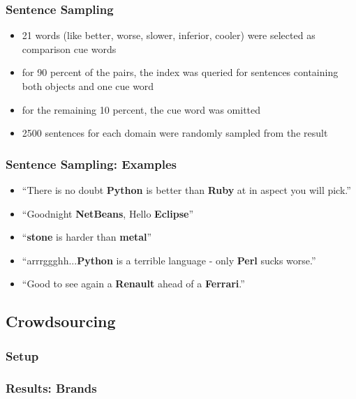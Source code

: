 \documentclass[11pt,aspectratio=169]{beamer}
\begin{document}
    \begin{frame}
        \frametitle{Sentence Sampling}

        \begin{itemize}
            \item 21 words (like better, worse, slower, inferior, cooler) were selected as comparison cue words
            \item for 90 percent of the pairs, the index was queried for sentences containing both objects and one cue word
            \item for the remaining 10 percent, the cue word was omitted
            \item 2500 sentences for each domain were randomly sampled from the result
        \end{itemize}

    \end{frame}
    
    \begin{frame}
      \frametitle{Sentence Sampling: Examples}
        \begin{itemize}
            \item \enquote{There is no doubt \textbf{Python} is better than \textbf{Ruby} at in aspect you will pick.}
            \item \enquote{Goodnight \textbf{NetBeans}, Hello \textbf{Eclipse}}
            \item \enquote{\textbf{stone} is harder than \textbf{metal}}
            \item \enquote{arrrggghh...\textbf{Python} is a terrible language - only \textbf{Perl} sucks worse.}
            \item \enquote{Good to see again a \textbf{Renault} ahead of a \textbf{Ferrari}.}
        \end{itemize}
    \end{frame}

    \subsection{Crowdsourcing}
    \begin{frame}
        \frametitle{Setup}

    \end{frame}

    \begin{frame}
        \frametitle{Results: Brands}

    \end{frame}
\end{document}
